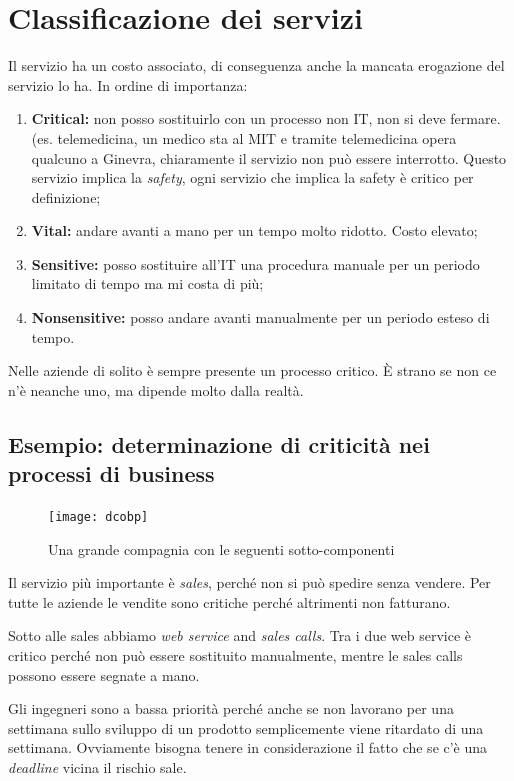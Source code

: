 \section{Classificazione dei servizi}

Il servizio ha un costo associato, di conseguenza anche la mancata erogazione
del servizio lo ha. In ordine di importanza:
\begin{enumerate}
 \item \textbf{Critical:} non posso sostituirlo con un processo non IT, non si
deve fermare. (es. telemedicina, un medico sta al MIT e tramite telemedicina 
opera qualcuno a Ginevra, chiaramente il servizio non può essere interrotto. 
Questo servizio implica la \textit{safety}, ogni servizio che implica la safety 
è critico per definizione;
 \item \textbf{Vital:} andare avanti a mano per un tempo molto ridotto. Costo
elevato;
 \item \textbf{Sensitive:} posso sostituire all'IT una procedura manuale per un
periodo limitato di tempo ma mi costa di più;

 \item \textbf{Nonsensitive:} posso andare avanti manualmente per un periodo
esteso di tempo.

\end{enumerate}

Nelle aziende di solito è sempre presente un processo critico. È strano se non
ce n'è neanche uno, ma dipende molto dalla realtà.

\subsection{Esempio: determinazione di criticità nei processi di business}

\begin{figure}[H]
 \centering
 \texttt{[image: dcobp]}
 \caption{Una grande compagnia con le seguenti sotto-componenti}
\end{figure}

Il servizio più importante è \textit{sales}, perché non si può spedire senza
vendere. Per tutte le aziende le vendite sono critiche perché altrimenti non
fatturano.

Sotto alle sales abbiamo \textit{web service} and \textit{sales calls}. Tra i
due web service è critico perché non può essere sostituito manualmente, mentre
le sales calls possono essere segnate a mano.

Gli ingegneri sono a bassa priorità perché anche se non lavorano per una
settimana sullo sviluppo di un prodotto semplicemente viene ritardato di una
settimana. Ovviamente bisogna tenere in considerazione il fatto che se c'è una
\textit{deadline} vicina il rischio sale.

